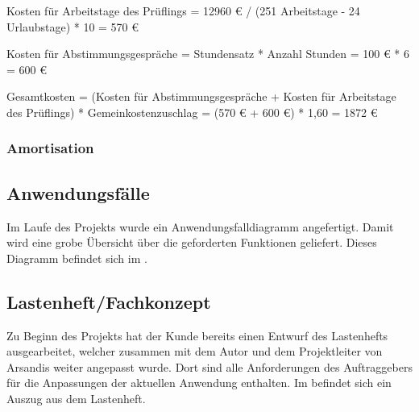 Kosten für Arbeitstage des Prüflings = 12960 € / (251 Arbeitstage - 24 Urlaubstage) * 10 = 570 €

Kosten für Abstimmungsgespräche = Stundensatz * Anzahl Stunden = 100 € * 6 = 600 €

Gesamtkosten = (Kosten für Abstimmungsgespräche + Kosten für Arbeitstage des Prüflings) * Gemeinkostenzuschlag = (570 € + 600 €) * 1,60 = 1872 €

\subsubsection{Amortisation} %

\subsection{Anwendungsfälle} %

Im Laufe des Projekts wurde ein Anwendungsfalldiagramm angefertigt.
Damit wird eine grobe Übersicht über die geforderten Funktionen geliefert.
Dieses Diagramm befindet sich im .


\subsection{Lastenheft/Fachkonzept} %
\label{sec:Lastenheft}
Zu Beginn des Projekts hat der Kunde bereits einen Entwurf des Lastenhefts ausgearbeitet, welcher zusammen mit dem Autor und dem Projektleiter von Arsandis weiter angepasst wurde.
Dort sind alle Anforderungen des Auftraggebers für die Anpassungen der aktuellen Anwendung enthalten.
Im  befindet sich ein Auszug aus dem Lastenheft.
